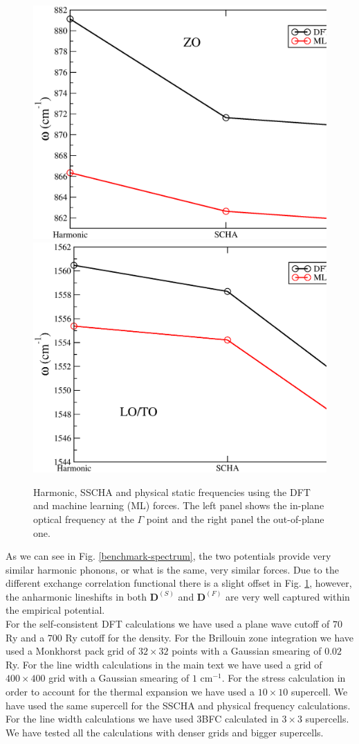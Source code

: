 \begin{figure}[ht]
\includegraphics[width=0.49\linewidth]{Figures/bm1.eps}
\includegraphics[width=0.49\linewidth]{Figures/bm2.eps}
\caption[Harmonic, SSCHA and physical static frequencies using the DFT and machine learning (ML) forces.]{Harmonic, 
	SSCHA and physical static frequencies using the DFT and machine learning (ML) forces. The left panel shows 
	the in-plane optical frequency at the $\Gamma$ point and the right panel the out-of-plane one.}
\label{benchmark}
\end{figure}
As we can see in Fig. \ref{benchmark-spectrum}, the two potentials provide very similar harmonic phonons, or what is 
the same, very similar forces. Due to the different exchange correlation functional there is a slight offset in 
Fig. \ref{benchmark}, however, the anharmonic lineshifts in both $\boldsymbol{D}^{(S)}$ and $\boldsymbol{D}^{(F)}$ 
are very well captured within the empirical potential. \\

For the self-consistent DFT calculations we have used a plane wave cutoff of $70$ Ry and a $700$ Ry cutoff for the 
density. For the Brillouin zone integration we have used a Monkhorst pack grid\cite{monkhorst1976special} of 
$32\times32$ points with a Gaussian smearing of $0.02$ Ry. For the line width calculations in the main text we have 
used a grid of $400\times400$ grid with a Gaussian smearing of $1$ cm$^{-1}$. For the stress calculation in order 
to account for the thermal expansion we have used a $10\times10$ supercell. We have used the same supercell for 
the SSCHA and physical frequency calculations. For the line width calculations we have used 3BFC calculated in 
$3\times3$ supercells. We have tested all the calculations with denser grids and bigger supercells.

